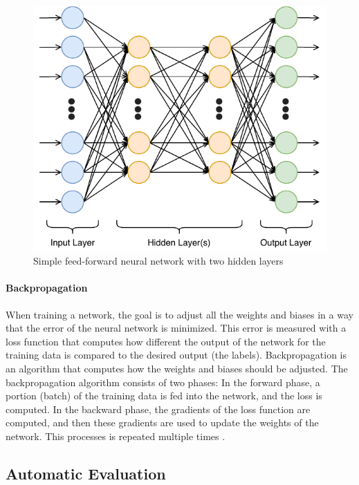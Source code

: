 \begin{figure}[h]
\centering
\includegraphics[width=0.45\paperwidth]{figures/neural-network}
\caption{Simple feed-forward neural network with two hidden layers}
\label{fig:neural-network}
\end{figure}

\paragraph{Backpropagation}

When training a network, the goal is to adjust all the weights and biases in a way that the error of the neural network is minimized.
This error is measured with a loss function that computes how different the output of the network for the training data is compared to the desired output (the labels).
Backpropagation is an algorithm that computes how the weights and biases should be adjusted.
The backpropagation algorithm consists of two phases: In the forward phase, a portion (batch) of the training data is fed into the network, and the loss is computed.
In the backward phase, the gradients of the loss function are computed, and then these gradients are used to update the weights of the network.
This processes is repeated multiple times \cite[p.~21--24]{Aggarwal2018}.


\subsection{Automatic Evaluation}\label{ssec:automatic-evaluation}

